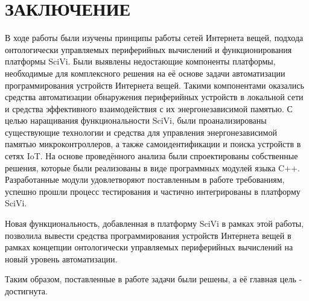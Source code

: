 \chapter*{ЗАКЛЮЧЕНИЕ}

В ходе работы были изучены принципы работы сетей Интернета вещей, подхода онтологически управляемых периферийных вычислений и функционирования платформы SciVi. Были выявлены недостающие компоненты платформы, необходимые для комплексного решения на её основе задачи автоматизации программирования устройств Интернета вещей. Такими компонентами оказались средства автоматизации обнаружения периферийных устройств в локальной сети и средства эффективного взаимодействия с их энергонезависимой памятью.
С целью наращивания функциональности SciVi, были проанализированы существующие технологии и средства для управления энергонезависимой памятью микроконтроллеров, а также самоидентификации и поиска устройств в сетях IoT.
На основе проведённого анализа были спроектированы собственные решения, которые были реализованы в виде программных модулей языка C++.
Разработанные модули удовлетворяют поставленным в работе требованиям, успешно прошли процесс тестирования и частично интегрированы в платформу SciVi. 

Новая функциональность, добавленная в платформу SciVi в рамках этой работы, позволила вывести средства программирования устройств Интернета вещей в рамках концепции онтологически управляемых периферийных вычислений на новый уровень автоматизации.

Таким образом, поставленные в работе задачи были решены, а её главная цель - достигнута.

